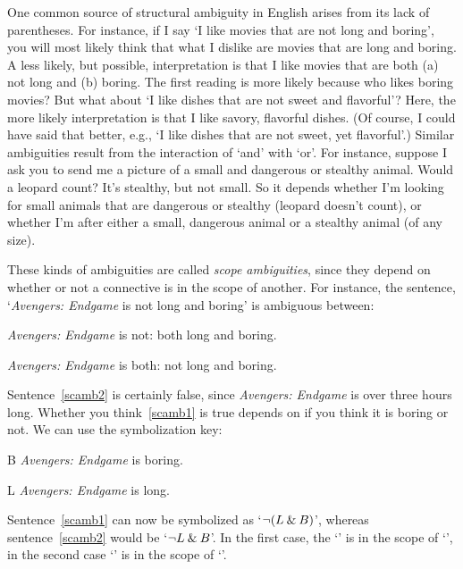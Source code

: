 One common source of structural ambiguity in English arises from its lack of parentheses. For instance, if I say `I like movies that are not long and boring', you will most likely think that what I dislike are movies that are long and boring. A less likely, but possible, interpretation is that I like movies that are both (a) not long and (b) boring. The first reading is more likely because who likes boring movies? But what about `I like dishes that are not sweet and flavorful'? Here, the more likely interpretation is that I like savory, flavorful dishes.  (Of course, I could have said that better, e.g., `I like dishes that are not sweet, yet flavorful'.) Similar ambiguities result from the interaction of `and' with `or'. For instance, suppose I ask you to send me a picture of a small and dangerous or stealthy animal.  Would a leopard count? It's stealthy, but not small. So it depends whether I'm looking for small animals that are dangerous or stealthy (leopard doesn't count), or whether I'm after either a small, dangerous animal or a stealthy animal (of any size).

These kinds of ambiguities are called \emph{scope ambiguities}, since they depend on whether or not a connective is in the scope of another. For instance, the sentence, `\emph{Avengers: Endgame} is not long and boring' is ambiguous between:
\begin{earg}
	\item[\ex{scamb1}] \emph{Avengers: Endgame} is not: both long and boring.
	\item[\ex{scamb2}] \emph{Avengers: Endgame} is both: not long and boring.
\end{earg}
Sentence~\ref{scamb2} is certainly false, since \emph{Avengers: Endgame} is over three hours long. Whether you think~\ref{scamb1} is true depends on if you think it is boring or not. We can use the symbolization key:
\begin{ekey}
	\item[B] \emph{Avengers: Endgame} is boring.
	\item[L] \emph{Avengers: Endgame} is long.
\end{ekey}
Sentence~\ref{scamb1} can now be symbolized as `$\neg(L \mathbin{\&} B)$', whereas sentence~\ref{scamb2} would be `$\neg L \mathbin{\&} B$'. In the first case, the `\eand' is in the scope of `\enot', in the second case `\enot' is in the scope of `\eand'.

